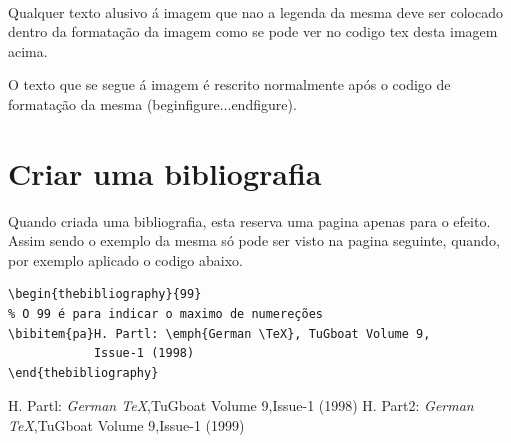\documentclass[a4paper,11pt]{report}%
\begin{document}
\paragraph{}
Qualquer texto alusivo á imagem que nao a legenda da mesma deve ser colocado dentro da formatação da imagem como se pode ver no codigo tex desta imagem acima.

O texto que se segue á imagem é rescrito normalmente após o codigo de formatação da mesma (begin{figure}...end{figure}).


\newpage
\section {Criar uma bibliografia}
Quando criada uma bibliografia, esta reserva uma pagina apenas para o efeito. Assim sendo o exemplo da mesma só pode ser visto na pagina seguinte, quando, por exemplo aplicado o codigo abaixo.
\begin{verbatim}
\begin{thebibliography}{99} 
% O 99 é para indicar o maximo de numereções
\bibitem{pa}H. Partl: \emph{German \TeX}, TuGboat Volume 9,
			Issue-1 (1998)
\end{thebibliography}
\end{verbatim}

\begin{thebibliography}{99}
H. Partl: \emph{German \TeX},TuGboat Volume 9,Issue-1 (1998)
H. Part2: \emph{German \TeX},TuGboat Volume 9,Issue-1 (1999)

\end{thebibliography}
\end{document}
